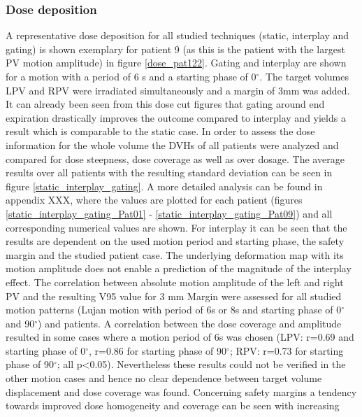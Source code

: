 \documentclass[type=dr, dr=rernat, accentcolor=tud7b,colorbacktitle, bigchapter, openright, twoside, 12pt ]{tudthesis}
\begin{document}
\subsubsection{Dose deposition}

A representative dose deposition for all studied techniques (static, interplay and gating) is shown exemplary for patient 9 (as this is the 
patient with the largest PV motion amplitude) in figure \ref{dose_pat122}. Gating and interplay are shown for a motion with a period of 6 s 
and a starting phase of 0$^{\circ}$. The target volumes LPV and RPV were irradiated simultaneously and a margin of 3mm was added. It can 
already been seen from this dose cut figures that gating around end expiration drastically improves the outcome compared to interplay and yields 
a result which is comparable to the static case.\newline
\newline
In order to assess the dose information for the whole volume the DVHs of all patients were analyzed and compared for dose steepness, 
dose coverage as well as over dosage. The average results over all patients with the resulting standard deviation can be seen in 
figure \ref{static_interplay_gating}. A more detailed analysis can be found in appendix XXX, where the values are plotted for each patient 
(figures \ref{static_interplay_gating_Pat01} - \ref{static_interplay_gating_Pat09}) and all corresponding numerical values are shown.\newline
\newline
For interplay it can be seen that the results are dependent on the used motion period and starting phase, the safety margin and 
the studied patient case. The underlying deformation map with its motion amplitude does not enable a prediction of the magnitude of the 
interplay effect. The correlation between absolute motion amplitude of the left and right PV and the resulting V95 value for 3 mm Margin were
assessed for all studied motion patterns (Lujan motion with period of 6s or 8s and starting phase of 0$^{\circ}$ and 90$^{\circ}$) and patients. 
A correlation between the dose coverage and amplitude resulted in some cases where a motion period of 6s was chosen (LPV: r=0.69 and starting 
phase of 0$^{\circ}$, r=0.86 for starting phase of 90$^{\circ}$; RPV: r=0.73 for starting phase of 90$^{\circ}$; all p<0.05). 
Nevertheless these results could not be verified in the other motion cases and hence no clear dependence between target volume displacement 
and dose coverage was found. Concerning safety margins a tendency towards improved dose homogeneity and coverage can be seen with increasing 
\end{document}
